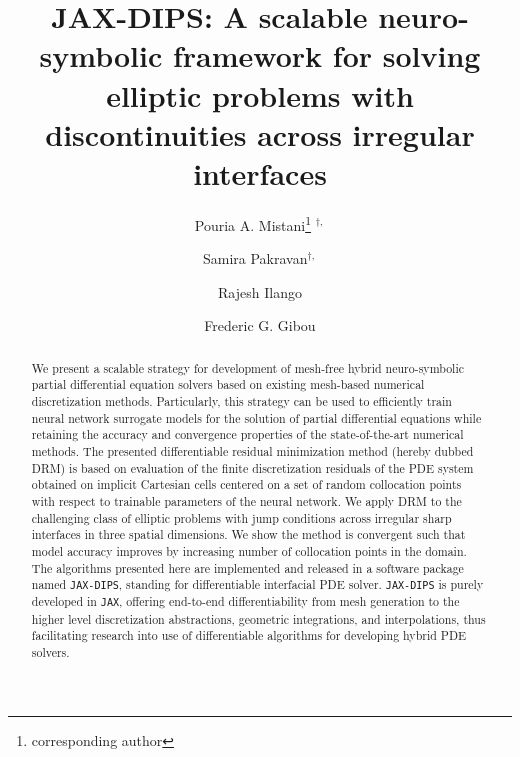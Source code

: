 \documentclass{elsarticle}
\begin{document}

\title{JAX-DIPS: A scalable neuro-symbolic framework for solving elliptic problems with discontinuities across irregular interfaces}



\author[1]{Pouria A. Mistani\thanks{corresponding author} $^{\dagger,}$}
\author[2]{Samira Pakravan$^{\dagger,}$}
\author[1]{Rajesh Ilango}
\author[2]{Frederic G. Gibou}

\address[1]{NVIDIA Corporation, Santa Clara, CA 95051, USA}
\address[2]{University of California, Santa Barbara, CA 93106-5070, USA}

\begin{abstract}
	We present a scalable strategy for development of mesh-free hybrid neuro-symbolic partial differential equation solvers based on existing mesh-based numerical discretization methods. Particularly, this strategy can be used to efficiently train neural network surrogate models for the solution of partial differential equations while retaining the accuracy and convergence properties of the state-of-the-art numerical methods. The presented differentiable residual minimization method (hereby dubbed DRM) is based on evaluation of the finite discretization residuals of the PDE system obtained on implicit Cartesian cells centered on a set of random collocation points with respect to trainable parameters of the neural network. We apply DRM to the challenging class of elliptic problems with jump conditions across irregular sharp interfaces in three spatial dimensions. We show the method is convergent such that model accuracy improves by increasing number of collocation points in the domain.  The algorithms presented here are implemented and released in a software package named \texttt{JAX-DIPS}, standing for differentiable interfacial PDE solver. \texttt{JAX-DIPS} is purely developed in \texttt{JAX}, offering end-to-end differentiability from mesh generation to the higher level discretization abstractions, geometric integrations, and interpolations, thus facilitating research into use of differentiable algorithms for developing hybrid PDE solvers.

\end{abstract}
\end{document}
